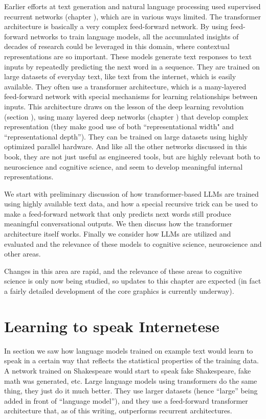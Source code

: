 Earlier efforts at text generation and natural language processing used supervised recurrent networks (chapter ), which are in various ways limited. The transformer architecture is basically a very complex feed-forward network. By using feed-forward networks to train language models, all the accumulated insights of decades of research could be leveraged in this domain, where contextual representations are so important. These models generate text responses to text inputs by repeatedly predicting the next word in a sequence. They are trained on large datasets of everyday text, like text from the internet, which is easily available. They often use a transformer architecture, which is a many-layered feed-forward network with special mechanisms for learning relationships between inputs. This architecture draws on the lesson of the deep learning revolution (section ), using many layered deep networks (chapter ) that develop complex representation (they make good use of both ``representational width" and ``representational depth''). They can be trained on large datasets using highly optimized parallel hardware.  And like all the other networks discussed in this book, they are not just useful as engineered tools, but are highly relevant both to neuroscience and cognitive science, and seem to develop meaningful internal representations. 

We start with preliminary discussion of how transformer-based LLMs are trained using highly available text data, and how a special recursive trick can be used to make a feed-forward network that only predicts next words still produce meaningful conversational outputs. We then discuss how the transformer architecture itself works.  Finally we consider how LLMs are utilized and evaluated and the relevance of these models to cognitive science, neuroscience and other areas.

Changes in this area are rapid, and the relevance of these areas to cognitive science is only now being studied, so updates to this chapter are expected (in fact a fairly detailed development of the core graphics is currently underway).

\section{Learning to speak Internetese}

In section  we saw how language models trained on example text would learn to speak in a certain way that reflects the statistical properties of the training data. A network trained on Shakespeare would start to speak fake Shakespeare, fake math was generated, etc. 
Large language models using transformers do the same thing, they just do it much better. They use larger datasets (hence ``large'' being added in front of ``language model''), and they use a feed-forward transformer architecture that, as of this writing, outperforms recurrent architectures. 

